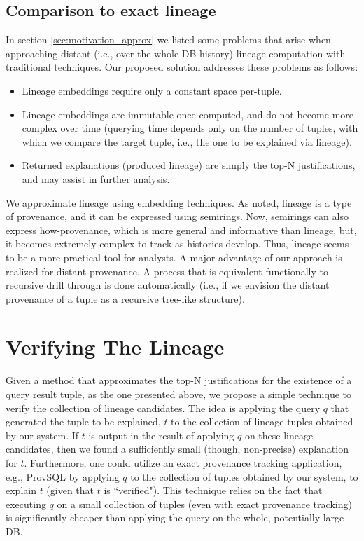 \subsection{Comparison to exact lineage} In section \ref{sec:motivation_approx} we listed some problems that arise when approaching distant (i.e., over the whole DB history) lineage computation with traditional techniques. Our proposed solution addresses these problems as follows:
\begin{itemize}
    \item Lineage embeddings require only a constant space per-tuple.
    \item Lineage embeddings are immutable once computed\footnotemark, and do not become more complex over time (querying time depends only on the number of tuples, with which we compare the target tuple, i.e., the one to be explained via lineage).
    \item Returned explanations (produced lineage) are simply the top-N justifications, and may assist in further analysis.
\end{itemize}
We approximate lineage using embedding techniques. As noted, lineage is a type of provenance, and it can be expressed using semirings. Now, semirings can also express how-provenance, which is more general and informative than lineage, but, it becomes extremely complex to track as histories develop. Thus, lineage seems to be a more practical tool for analysts.
A major advantage of our approach is realized for distant provenance. A process that is equivalent functionally to recursive drill through is done automatically (i.e., if we envision the distant provenance of a tuple as a recursive tree-like structure).\\

\section{Verifying The Lineage}
Given a method that approximates the top-N justifications for the existence of a query result tuple, as the one presented above, we propose a simple technique to verify the collection of lineage candidates. The idea is applying the query $q$ that generated the tuple to be explained, $t$ to the collection of lineage tuples obtained by our system. If $t$ is output in the result of applying $q$ on these lineage candidates, then we found a sufficiently small (though, non-precise) explanation for $t$. Furthermore, one could utilize an exact provenance tracking application, e.g., ProvSQL \cite{provsql_github} by applying $q$ to the collection of tuples obtained by our system, to explain $t$ (given that $t$ is ``verified"). This technique relies on the fact that executing $q$ on a small collection of tuples (even with exact provenance tracking) is significantly cheaper than applying the query on the whole, potentially large DB.

